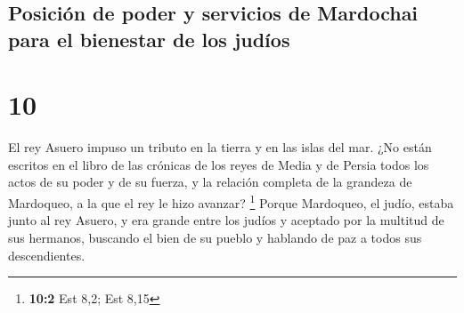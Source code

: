 \hypertarget{posiciuxf3n-de-poder-y-servicios-de-mardochai-para-el-bienestar-de-los-juduxedos}{%
\subsection{Posición de poder y servicios de Mardochai para el bienestar
de los
judíos}\label{posiciuxf3n-de-poder-y-servicios-de-mardochai-para-el-bienestar-de-los-juduxedos}}

\hypertarget{section-9}{%
\section{10}\label{section-9}}

 El rey Asuero impuso un tributo en la tierra y en las
islas del mar.  ¿No están escritos en el libro de las
crónicas de los reyes de Media y de Persia todos los actos de su poder y
de su fuerza, y la relación completa de la grandeza de Mardoqueo, a la
que el rey le hizo avanzar? \footnote{\textbf{10:2} Est 8,2; Est 8,15}
 Porque Mardoqueo, el judío, estaba junto al rey Asuero, y
era grande entre los judíos y aceptado por la multitud de sus hermanos,
buscando el bien de su pueblo y hablando de paz a todos sus
descendientes.
